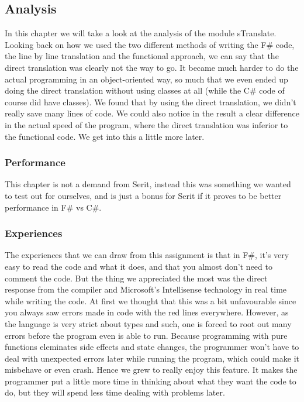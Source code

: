 \documentclass[12pt, a4paper]{article}
\begin{document}
\newpage


\subsection{Analysis}
In this chapter we will take a look at the analysis of the module sTranslate.
Looking back on how we used the two different methods of writing the F\# code, the line by line translation and the functional approach, we can say that the direct translation was clearly not the way to go. It became much harder to do the actual programming in an object-oriented way, so much that we even ended up doing the direct translation without using classes at all (while the C\# code of course did have classes). We found that by using the direct translation, we didn't really save many lines of code. We could also notice in the result a clear difference in the actual speed of the program, where the direct translation was inferior to the functional code. We get into this a little more later.

\subsubsection{Performance}
This chapter is not a demand from Serit, instead this was something we wanted to test out for ourselves, and is just a bonus for Serit if it proves to be better performance in F\# vs C\#.
\subsubsection{Experiences}
The experiences that we can draw from this assignment is that in F\#, it’s very easy to read the code and what it does, and that you almost don’t need to comment the code. But the thing we appreciated the most was the direct response from the compiler and Microsoft’s Intellisense technology in real time while writing the code. At first we thought that this was a bit unfavourable since you always saw errors made in code with the red lines everywhere. However, as the language is very strict about types and such, one is forced to root out many errors before the program even is able to run. Because programming with pure functions eleminates side effects and state changes, the programmer won't have to deal with unexpected errors later while running the program, which could make it misbehave or even crash. Hence we grew to really enjoy this feature. It makes the programmer put a little more time in thinking about what they want the code to do, but they will spend less time dealing with problems later.\\
\end{document}
